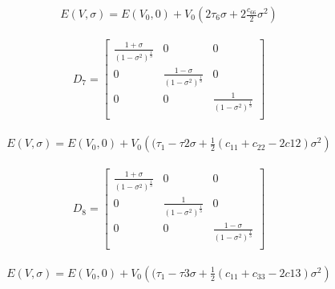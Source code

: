 \documentclass[12pt,twoside]{manual}
\begin{document}
  \begin{equation}
    \begin{split}
    E(V,\sigma) = E(V_{0},0) + V_{0} \left(2 \tau_{6} \sigma + 2 \frac{c_{66}}{2} \sigma^2 \right)
    \end{split}
  \end{equation}



  \begin{equation}
    \begin{split}
      D_{7} = 
      \begin{bmatrix}
      \frac{1 + \sigma}{(1-\sigma^2)^{\frac{1}{3}}} & 0           & 0              \\
      0                                    & \frac{1 - \sigma}{(1-\sigma^2)^{\frac{1}{3}}}      &   0  \\
      0  &   0  & \frac{1}{(1-\sigma^2)^{\frac{1}{3}}}       \\
      \end{bmatrix}
    \end{split}
  \end{equation}

  \begin{equation}
    \begin{split}
    E(V,\sigma) = E(V_{0},0) + V_{0} \left((\tau_{1}-\tau{2} \sigma + \frac{1}{2} (c_{11} + c_{22} - 2 c{12}) \sigma^2 \right)
    \end{split}
  \end{equation}


  \begin{equation}
    \begin{split}
      D_{8} = 
      \begin{bmatrix}
      \frac{1 + \sigma}{(1-\sigma^2)^{\frac{1}{3}}} & 0           & 0              \\
      0                                    & \frac{1}{(1-\sigma^2)^{\frac{1}{3}}}      &   0  \\
      0  &   0  & \frac{1-\sigma}{(1-\sigma^2)^{\frac{1}{3}}}       \\
      \end{bmatrix}
    \end{split}
  \end{equation}

  \begin{equation}
    \begin{split}
    E(V,\sigma) = E(V_{0},0) + V_{0} \left((\tau_{1}-\tau{3} \sigma + \frac{1}{2} (c_{11} + c_{33} - 2 c{13}) \sigma^2 \right)
    \end{split}
  \end{equation}
\end{document}
